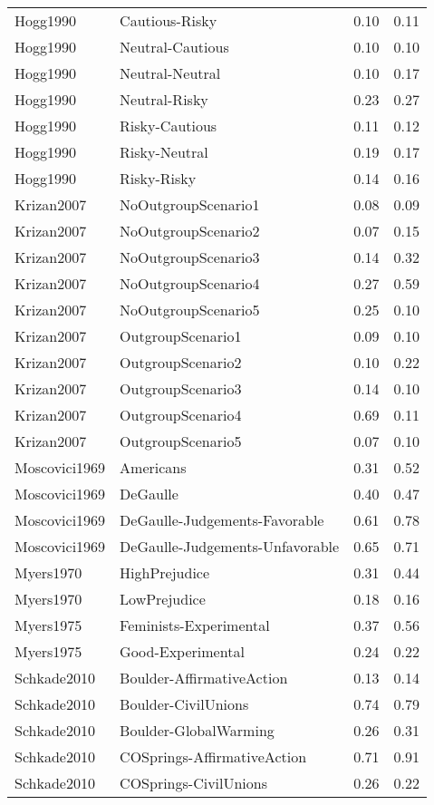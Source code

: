 \begin{longtable}{llrr}
\addlinespace
Hogg1990 & Cautious-Risky & 0.10 & 0.11\\
Hogg1990 & Neutral-Cautious & 0.10 & 0.10\\
Hogg1990 & Neutral-Neutral & 0.10 & 0.17\\
Hogg1990 & Neutral-Risky & 0.23 & 0.27\\
Hogg1990 & Risky-Cautious & 0.11 & 0.12\\
\addlinespace
Hogg1990 & Risky-Neutral & 0.19 & 0.17\\
Hogg1990 & Risky-Risky & 0.14 & 0.16\\
Krizan2007 & NoOutgroupScenario1 & 0.08 & 0.09\\
Krizan2007 & NoOutgroupScenario2 & 0.07 & 0.15\\
Krizan2007 & NoOutgroupScenario3 & 0.14 & 0.32\\
\addlinespace
Krizan2007 & NoOutgroupScenario4 & 0.27 & 0.59\\
Krizan2007 & NoOutgroupScenario5 & 0.25 & 0.10\\
Krizan2007 & OutgroupScenario1 & 0.09 & 0.10\\
Krizan2007 & OutgroupScenario2 & 0.10 & 0.22\\
Krizan2007 & OutgroupScenario3 & 0.14 & 0.10\\
\addlinespace
Krizan2007 & OutgroupScenario4 & 0.69 & 0.11\\
Krizan2007 & OutgroupScenario5 & 0.07 & 0.10\\
Moscovici1969 & Americans & 0.31 & 0.52\\
Moscovici1969 & DeGaulle & 0.40 & 0.47\\
Moscovici1969 & DeGaulle-Judgements-Favorable & 0.61 & 0.78\\
\addlinespace
Moscovici1969 & DeGaulle-Judgements-Unfavorable & 0.65 & 0.71\\
Myers1970 & HighPrejudice & 0.31 & 0.44\\
Myers1970 & LowPrejudice & 0.18 & 0.16\\
Myers1975 & Feminists-Experimental & 0.37 & 0.56\\
Myers1975 & Good-Experimental & 0.24 & 0.22\\
\addlinespace
Schkade2010 & Boulder-AffirmativeAction & 0.13 & 0.14\\
Schkade2010 & Boulder-CivilUnions & 0.74 & 0.79\\
Schkade2010 & Boulder-GlobalWarming & 0.26 & 0.31\\
Schkade2010 & COSprings-AffirmativeAction & 0.71 & 0.91\\
Schkade2010 & COSprings-CivilUnions & 0.26 & 0.22\\*
\end{longtable}
